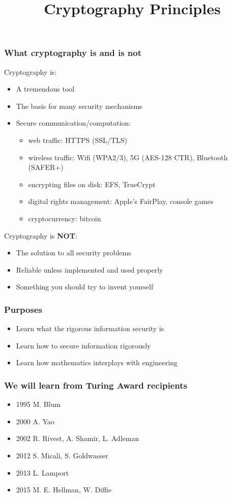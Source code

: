 

\title{Cryptography Principles}


\maketitle
\begin{frame}\frametitle{What cryptography is and is not}
Cryptography is:
\begin{itemize}
\item A tremendous tool
\item The basis for many security mechanisms
\item Secure communication/computation: 
\begin{itemize}
\item web traffic: HTTPS (SSL/TLS)
\item wireless traffic: Wifi (WPA2/3), 5G (AES-128 CTR), Bluetooth (SAFER+)
\item encrypting files on disk: EFS, TrueCrypt
\item digital rights management: Apple's FairPlay, console games 
\item cryptocurrency: bitcoin
\end{itemize}
\end{itemize}
Cryptography is \textbf{NOT}:
\begin{itemize}
\item The solution to all security problems
\item Reliable unless implemented and used properly
\item Something you should try to invent yourself	
\end{itemize}
\end{frame}
\begin{frame}\frametitle{Purposes}
\begin{itemize}
\item Learn what the rigorous information security is
\item Learn how to secure information rigorously
\item Learn how mathematics interplays with engineering
\end{itemize}
\end{frame}
\begin{frame}\frametitle{We will learn from Turing Award recipients}
\begin{itemize}
\item{1995} M. Blum
\item{2000} A. Yao
\item{2002} R. Rivest, A. Shamir, L. Adleman
\item{2012} S. Micali, S. Goldwasser
\item{2013} L. Lamport
\item{2015} M. E. Hellman, W. Diffie
\end{itemize}	
\end{frame}
